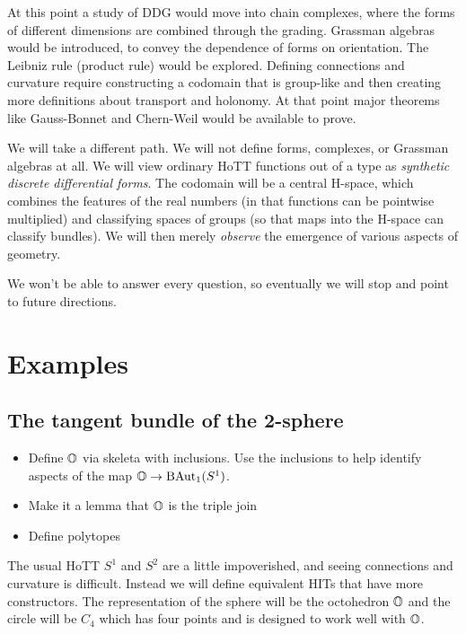 At this point a study of DDG would move into chain complexes, where the
forms of different dimensions are combined through the grading. Grassman
algebras would be introduced, to convey the dependence of forms on
orientation. The Leibniz rule (product rule) would be explored. Defining
connections and curvature require constructing a codomain that is
group-like and then creating more definitions about transport and
holonomy. At that point major theorems like Gauss-Bonnet and Chern-Weil
would be available to prove.

We will take a different path. We will not define forms, complexes, or
Grassman algebras at all. We will view ordinary HoTT functions out of a
type as \emph{synthetic discrete differential forms}. The codomain will
be a central H-space, which combines the features of the real numbers
(in that functions can be pointwise multiplied) and classifying spaces
of groups (so that maps into the H-space can classify bundles). We will
then merely \emph{observe} the emergence of various aspects of geometry.

We won't be able to answer every question, so eventually we will stop
and point to future directions.

\section{Examples}\label{examples}

\subsection{The tangent bundle of the
2-sphere}\label{the-tangent-bundle-of-the-2-sphere}

\begin{itemize}
\item
  Define \(\mathbb{O}\) via skeleta with inclusions. Use the inclusions to help
  identify aspects of the map \(\mathbb{O}\to\mathrm{BAut}_1(S^1)\).
\item
  Make it a lemma that \(\mathbb{O}\) is the triple join
\item
  Define polytopes
\end{itemize}

The usual HoTT \(S^1\) and \(S^2\) are a little impoverished, and seeing
connections and curvature is difficult. Instead we will define
equivalent HITs that have more constructors. The representation of the
sphere will be the octohedron \(\mathbb{O}\) and the circle will be \(C_4\)
which has four points and is designed to work well with \(\mathbb{O}\).


